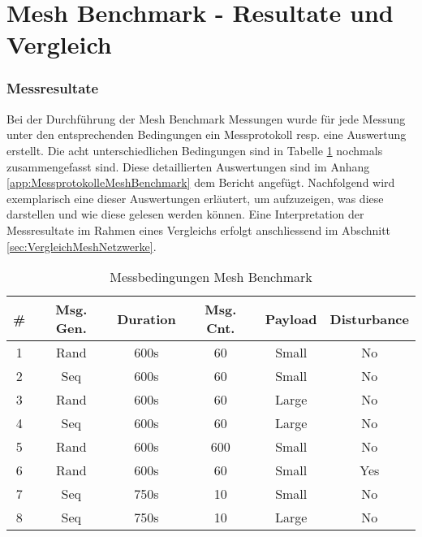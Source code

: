 \vspace*{4cm}
\part{Mesh Benchmark - Resultate und Vergleich}\label{part:MeshBenchmarkResultateundVergleich}
\vspace*{\fill}
\clearpage

\section{Messresultate}\label{sec:Messresultate}
Bei der Durchführung der Mesh Benchmark Messungen wurde für jede Messung unter den entsprechenden Bedingungen ein Messprotokoll resp. eine Auswertung erstellt. Die acht unterschiedlichen Bedingungen sind in Tabelle \ref{tab:MessungenMeshBenchmark} nochmals zusammengefasst sind.
Diese detaillierten Auswertungen sind im Anhang \ref{app:MessprotokolleMeshBenchmark} dem Bericht angefügt.
Nachfolgend wird exemplarisch eine dieser Auswertungen erläutert, um aufzuzeigen, was diese darstellen und wie diese gelesen werden können.
Eine Interpretation der Messresultate im Rahmen eines Vergleichs erfolgt anschliessend im Abschnitt \ref{sec:VergleichMeshNetzwerke}.

\begin{table}[h]
\centering
\begin{tabular}{|c|c|c|c|c|c|} 
\hline
\textbf{\#}  & \textbf{Msg. Gen.}  & \textbf{Duration}  & \textbf{Msg. Cnt.}  & \textbf{Payload }  & \textbf{Disturbance}  \\ 
\hline
1 & Rand & 600s & 60 & Small & No \\ 
\hline
2 & Seq & 600s & 60 & Small & No \\ 
\hline
3 & Rand & 600s & 60 & Large & No \\ 
\hline
4 & Seq & 600s & 60 & Large & No \\ 
\hline
5 & Rand & 600s & 600 & Small & No \\ 
\hline
6 & Rand & 600s & 60 & Small & Yes \\ 
\hline
7 & Seq & 750s & 10 & Small & No \\ 
\hline
8 & Seq & 750s & 10 & Large & No \\
\hline
\end{tabular}
\caption{Messbedingungen Mesh Benchmark}
\label{tab:MessungenMeshBenchmark}
\end{table}


